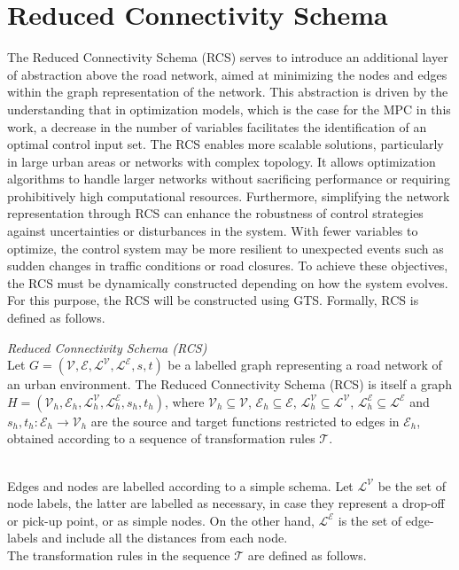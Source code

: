 \newpage


\section{Reduced Connectivity Schema }\label{sec:gts_mpc}
The Reduced Connectivity Schema (RCS) serves to introduce an additional layer of abstraction above the road network, aimed at minimizing the nodes and edges within the graph representation of the network. This abstraction is driven by the understanding that in optimization models, which is the case for the MPC in this work, a decrease in the number of variables facilitates the identification of an optimal control input set. The RCS enables more scalable solutions, particularly in large urban areas or networks with complex topology. It allows optimization algorithms to handle larger networks without sacrificing performance or requiring prohibitively high computational resources. Furthermore, simplifying the network representation through RCS can enhance the robustness of control strategies against uncertainties or disturbances in the system. With fewer variables to optimize, the control system may be more resilient to unexpected events such as sudden changes in traffic conditions or road closures. To achieve these objectives, the RCS must be dynamically constructed depending on how the system evolves. For this purpose, the RCS will be constructed using GTS. Formally, RCS is defined as follows. \\

\begin{definition}{\textit{Reduced Connectivity Schema (RCS)}\\}
	Let $G = (\mathcal{V},\mathcal{E},\mathcal{L}^\mathcal{V},\mathcal{L}^\mathcal{E},s,t)$ be a labelled graph representing a road network of an urban environment. The Reduced Connectivity Schema (RCS) is itself a graph $H = (\mathcal{V}_h,\mathcal{E}_h,\mathcal{L}^\mathcal{V}_h,\mathcal{L}^\mathcal{E}_h,s_h,t_h)$, where $\mathcal{V}_h \subseteq \mathcal{V}$, $\mathcal{E}_h \subseteq \mathcal{E}$, $\mathcal{L}^\mathcal{V}_h \subseteq \mathcal{L}^\mathcal{V}$, $\mathcal{L}^\mathcal{E}_h \subseteq \mathcal{L}^\mathcal{E}$ and $s_h, t_h : \mathcal{E}_h \rightarrow \mathcal{V}_h$ are the source and target functions restricted to edges in $\mathcal{E}_h$, obtained according to a sequence of transformation rules $\mathcal{T}$.
\end{definition}\\

Edges and nodes are labelled according to a simple schema. Let $\mathcal{L}^\mathcal{V}$ be the set of node labels, the latter are labelled as necessary, in case they represent a drop-off or pick-up point, or as simple nodes. On the other hand, $\mathcal{L}^\mathcal{E}$ is the set of edge-labels and include all the distances from each node. \\
The transformation rules in the sequence $\mathcal{T}$ are defined as follows.\\

